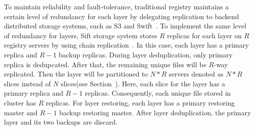 To maintain reliability and fault-tolerance, 
traditional registry maintains a certain level of redundancy for each layer 
by delegating replication to backend
distributed storage systems, such as S3 and Swift~\cite{xxx}.
To implement the same level of redundancy for layers,
Sift storage system stores $R$ replicas for each layer on $R$ registry servers 
by using
chain replication~\cite{xxx}.
In this case, each layer has a primary replica and $R-1$ backup replicas.
During layer deduplication, 
only primary replica is dedupcated.
After that,
the remaining unique files
will be $R$-way replicated.
Then the layer will be
partitioned to $N*R$ servers
denoted as $N*R$ slices instead of $N$ slices(see Section~\cite{xxx}).
Here, each slice for the layer 
has a primary replica and $R-1$ replicas.
Consequently, each unique file stored in cluster
has $R$ replicas.
For layer restoring,
each layer has a primary restoring master and $R-1$ backup restoring master. 
After layer deduplication, 
the primary layer and its two backups are discard.
 


%
%
%

